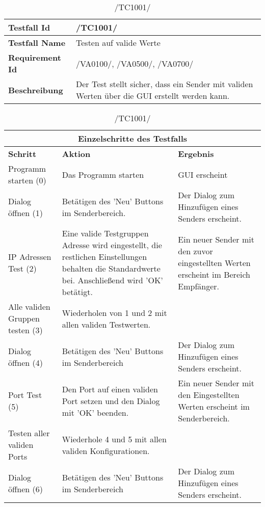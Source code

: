 \begin{table}[h]
\caption{/TC1001/}
\label{tab:TC1001}
\begin{center}
\begin{tabular}{|p{3.5cm}|p{9cm}|}
\hline
\textbf{Testfall Id} & /TC1001/\\
\hline
\textbf{Testfall Name} & Testen auf valide Werte\\
\hline
\textbf{Requirement Id} & /VA0100/, /VA0500/, /VA0700/\\
\hline
\textbf{Beschreibung} & Der Test stellt sicher, dass ein Sender mit validen
Werten über die GUI erstellt werden kann. \\
\hline
\end{tabular}
\begin{tabular}{|p{2.5cm}|p{5cm}|p{4.55cm}|}
\multicolumn{3}{|c|}{\textbf{Einzelschritte des Testfalls}} \\
\hline
\textbf{Schritt} & \textbf{Aktion} & \textbf{Ergebnis}\\
\hline
Programm starten (0) & Das Programm starten & GUI erscheint
 \\
\hline
Dialog öffnen (1) & Betätigen des 'Neu' Buttons im Senderbereich. & Der Dialog
 zum Hinzufügen eines Senders erscheint.
\\
\hline
IP Adressen Test (2) & Eine valide Testgruppen Adresse wird eingestellt, die
 restlichen Einstellungen behalten die Standardwerte bei. Anschließend wird 'OK' betätigt.
 & Ein neuer Sender mit den zuvor eingestellten Werten erscheint im Bereich
 Empfänger.
 \\
\hline
Alle validen Gruppen testen (3) & Wiederholen von 1 und 2 mit allen validen
Testwerten. &
\\
\hline
Dialog öffnen (4) & Betätigen des 'Neu' Buttons im Senderbereich & Der Dialog
 zum Hinzufügen eines Senders erscheint.
\\
\hline
Port Test (5) & Den Port auf einen validen Port setzen und den Dialog mit 'OK'
 beenden. & Ein neuer Sender mit den Eingestellten Werten erscheint im
 Senderbereich.
\\
\hline
Testen aller validen Ports & Wiederhole 4 und 5 mit allen validen
 Konfigurationen. &
\\
\hline
Dialog öffnen (6) & Betätigen des 'Neu' Buttons im Senderbereich & Der Dialog
 zum Hinzufügen eines Senders erscheint.
\\
\hline
\end{tabular}
\end{center}
\end{table}

